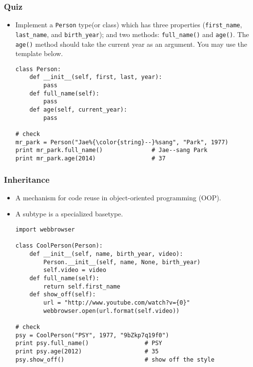 \documentclass{beamer}
\begin{document}
\begin{frame}[fragile]
\frametitle{Quiz}
\begin{itemize}
\item Implement a \lstinline{Person} type(or class) which has
      three properties (\lstinline{first_name},
      \lstinline{last_name}, and \lstinline{birth_year});
      and two methods: \lstinline{full_name()} and
      \lstinline{age()}. The \lstinline{age()} method
      should take the current year
      as an argument. You may use the template below. 
\begin{lstlisting}[escapechar=\%]
class Person:
    def __init__(self, first, last, year):
        pass
    def full_name(self):
        pass
    def age(self, current_year):
        pass

# check
mr_park = Person("Jae%{\color{string}--}%sang", "Park", 1977)
print mr_park.full_name()              # Jae--sang Park
print mr_park.age(2014)                # 37 
\end{lstlisting}
\end{itemize}
\end{frame}

\begin{frame}[fragile]
\frametitle{Inheritance}
\begin{itemize}
\item A mechanism for code reuse in object-oriented
      programming (OOP).
\item A subtype is a specialized basetype.
\begin{lstlisting}
import webbrowser

class CoolPerson(Person):
    def __init__(self, name, birth_year, video):
        Person.__init__(self, name, None, birth_year)
        self.video = video
    def full_name(self):
        return self.first_name
    def show_off(self):
        url = "http://www.youtube.com/watch?v={0}"
        webbrowser.open(url.format(self.video))   

# check
psy = CoolPerson("PSY", 1977, "9bZkp7q19f0")
print psy.full_name()                # PSY
print psy.age(2012)                  # 35
psy.show_off()                       # show off the style
\end{lstlisting}
\end{itemize}
\end{frame}
\end{document}
